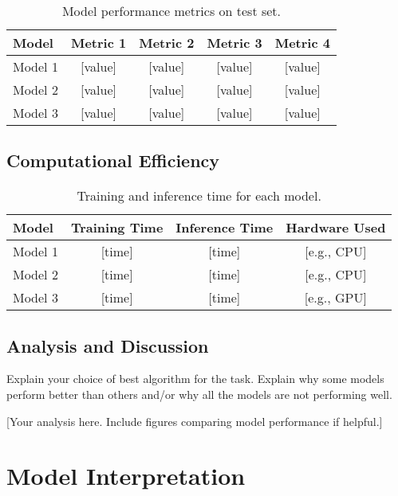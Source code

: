 \documentclass[aps,prl,preprint,groupedaddress]{revtex4-2}
\begin{document}
\begin{table}[H]
\centering
\caption{Model performance metrics on test set.}
\label{tab:performance}
\begin{tabular}{@{}lcccc@{}}
\toprule
\textbf{Model} & \textbf{Metric 1} & \textbf{Metric 2} & \textbf{Metric 3} & \textbf{Metric 4} \\ 
\midrule
Model 1 & [value] & [value] & [value] & [value] \\
Model 2 & [value] & [value] & [value] & [value] \\
Model 3 & [value] & [value] & [value] & [value] \\
\bottomrule
\end{tabular}
\end{table}

\subsection{Computational Efficiency}

\begin{table}[H]
\centering
\caption{Training and inference time for each model.}
\label{tab:timing}
\begin{tabular}{@{}lccc@{}}
\toprule
\textbf{Model} & \textbf{Training Time} & \textbf{Inference Time} & \textbf{Hardware Used} \\ 
\midrule
Model 1 & [time] & [time] & [e.g., CPU] \\
Model 2 & [time] & [time] & [e.g., CPU] \\
Model 3 & [time] & [time] & [e.g., GPU] \\
\bottomrule
\end{tabular}
\end{table}

\subsection{Analysis and Discussion}
Explain your choice of best algorithm for the task. Explain why some models perform better than others and/or why all the models are not performing well.

[Your analysis here. Include figures comparing model performance if helpful.]

\section{Model Interpretation}
\label{sec:interpretation}
\end{document}
